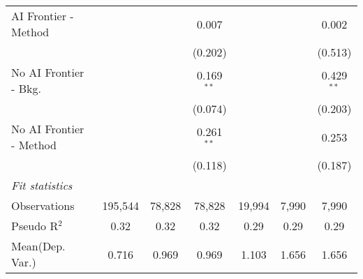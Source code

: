 \begin{tabular}{lcccccc}
   AI Frontier - Method    &               &               & 0.007         &               &             & 0.002\\   
                           &               &               & (0.202)       &               &             & (0.513)\\   
   No AI Frontier - Bkg.   &               &               & 0.169$^{**}$  &               &             & 0.429$^{**}$\\   
                           &               &               & (0.074)       &               &             & (0.203)\\   
   No AI Frontier - Method &               &               & 0.261$^{**}$  &               &             & 0.253\\   
                           &               &               & (0.118)       &               &             & (0.187)\\   
   \midrule
   \emph{Fit statistics}\\
   Observations            & 195,544       & 78,828        & 78,828        & 19,994        & 7,990       & 7,990\\  
   Pseudo R$^2$            & 0.32          & 0.32          & 0.32          & 0.29          & 0.29        & 0.29\\  
Mean(Dep. Var.) & 0.716 & 0.969 & 0.969 & 1.103 & 1.656 & 1.656 \\
   

\end{tabular}
